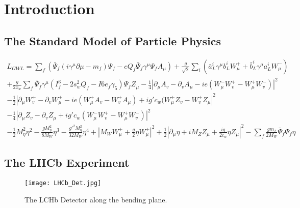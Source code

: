 \section{Introduction}

	\subsection{The Standard Model of Particle Physics}

    

    \begin{multline} \label{eqn:std-mod}
      L_{GWL} = \sum_{f} ( \bar{\Psi}_{f} ( i \gamma^\mu \partial \mu - m_{f} ) \Psi_{f} - eQ_{f} \bar{\Psi}_{f} \gamma^\mu \Psi_{f} A_{\mu} ) + \frac{g}{\sqrt{2}} \sum_{i} ( \bar{a}^i_L \gamma^\mu b^i_L W^+_\mu + \bar{b}^i_L \gamma^\mu a^i_L W^-_\mu )                        \\                           
              + \frac{g}{2x_w} \sum_f \bar{\Psi}_f \gamma^\mu ( I^3_f - 2s^2_w Q_f - I6e_f \gamma_5 ) \Psi_f Z_\mu - \frac{1}{4} | \partial_\mu A_v - \partial_v A_\mu - ie(W^-_\mu W^+_v - W^+_\mu W^-_v ) |^2                                         \\                                     
              - \frac{1}{2} | \partial_\mu W^+_v - \partial_v W^+_\mu - ie ( W^+_\mu A_v - W^+_v A_\mu ) + ig' c_w (W^+_\mu Z_v - W^+_v Z_\mu |^2 \\
              - \frac{1}{4} | \partial_\mu Z_v - \partial_v Z_\mu + ig' c_w (W^-_\mu W^+_v - W^+_\mu W^-_v ) |^2                                   \\     
              - \frac{1}{2} M^2_\eta \eta^2 - \frac{gM^2_\eta}{8M_W} \eta^3 - \frac{g'^2 M^2_\eta}{32M_W}\eta^4 + | M_W W^+_\mu + \frac{g}{2} \eta W^+_\mu |^2 + \frac{1}{2} | \partial_\mu \eta + i M_Z Z_\mu + \frac{ig}{2c_w} \eta Z_\mu |^2 - \sum_f \frac{g m_f}{2 M_W} \bar{\Psi}_f \Psi_f \eta                                                                                 
    \end{multline}



	\subsection{The LHCb Experiment}
		\begin{figure}[h]
		\centering
		\texttt{[image: LHCb\_Det.jpg]}
		\caption{The LCHb Detector along the bending plane.}
		\label{fig:LCHb_Collab}
		\end{figure}
		
